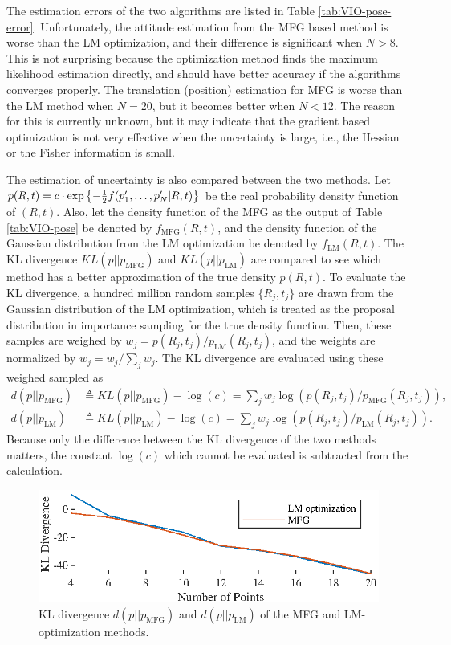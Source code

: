 The estimation errors of the two algorithms are listed in Table \ref{tab:VIO-pose-error}.
Unfortunately, the attitude estimation from the MFG based method is worse than the LM optimization, and their difference is significant when $N>8$.
This is not surprising because the optimization method finds the maximum likelihood estimation directly, and should have better accuracy if the algorithms converges properly.
The translation (position) estimation for MFG is worse than the LM method when $N=20$, but it becomes better when $N<12$.
The reason for this is currently unknown, but it may indicate that the gradient based optimization is not very effective when the uncertainty is large, i.e., the Hessian or the Fisher information is small.

The estimation of uncertainty is also compared between the two methods.
Let $p(R,t) = c\cdot\exp\left\{ -\tfrac{1}{2} f(p'_1,\ldots,p'_N|R,t) \right\}$ be the real probability density function of $(R,t)$.
Also, let the density function of the MFG as the output of Table \ref{tab:VIO-pose} be denoted by $f_\text{MFG}(R,t)$, and the density function of the Gaussian distribution from the LM optimization be denoted by $f_\text{LM}(R,t)$.
The KL divergence $KL(p||p_\text{MFG})$ and $KL(p||p_\text{LM})$ are compared to see which method has a better approximation of the true density $p(R,t)$.
To evaluate the KL divergence, a hundred million random samples $\{R_j,t_j\}$ are drawn from the Gaussian distribution of the LM optimization, which is treated as the proposal distribution in importance sampling for the true density function.
Then, these samples are weighed by $w_j = p(R_j,t_j)/p_\text{LM}(R_j,t_j)$, and the weights are normalized by $w_j = w_j/\sum_{j} w_j$.
The KL divergence are evaluated using these weighed sampled as
\begin{align*}
	d(p||p_\text{MFG}) &\triangleq KL(p||p_\text{MFG}) - \log(c) = \sum_j w_j \log\left( p(R_j,t_j)/p_\text{MFG}(R_j,t_j) \right), \\
	d(p||p_\text{LM}) &\triangleq KL(p||p_\text{LM}) - \log(c) = \sum_j w_j \log\left( p(R_j,t_j)/p_\text{LM}(R_j,t_j) \right).
\end{align*}
Because only the difference between the KL divergence of the two methods matters, the constant $\log(c)$ which cannot be evaluated is subtracted from the calculation.

\begin{figure}
	\centering
	\includegraphics[scale=1.4]{figures/VIO-KL}
	\caption{KL divergence $d(p||p_\text{MFG})$ and $d(p||p_\text{LM})$ of the MFG and LM-optimization methods.}
	\label{fig:VIO-KL}
\end{figure}


